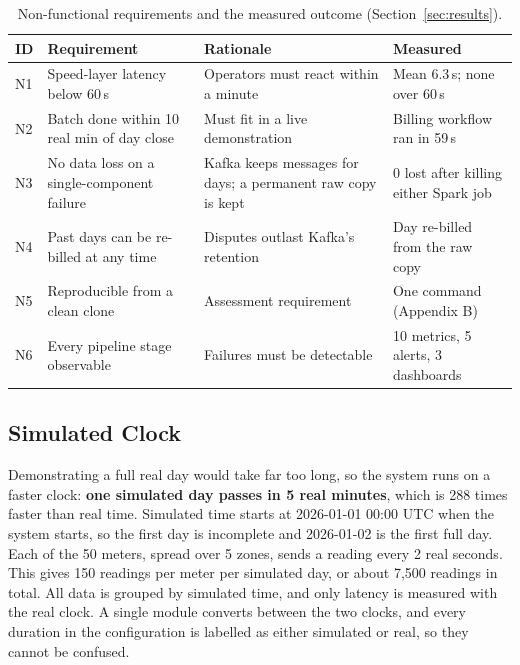 \documentclass[11pt,a4paper]{article}
\begin{document}
\begin{table}[!htbp]
\centering
\caption{Non-functional requirements and the measured outcome (Section~\ref{sec:results}).}
\label{tab:nfr}
\small
\begin{tabularx}{\textwidth}{L{0.6cm} L{4.6cm} L{3.8cm} X}
\toprule
\textbf{ID} & \textbf{Requirement} & \textbf{Rationale} & \textbf{Measured} \\
\midrule
N1 & Speed-layer latency below 60\,s & Operators must react within a minute & Mean 6.3\,s; none over 60\,s \\
N2 & Batch done within 10 real min of day close & Must fit in a live demonstration & Billing workflow ran in 59\,s \\
N3 & No data loss on a single-component failure & Kafka keeps messages for days; a permanent raw copy is kept & 0 lost after killing either Spark job \\
N4 & Past days can be re-billed at any time & Disputes outlast Kafka's retention & Day re-billed from the raw copy \\
N5 & Reproducible from a clean clone & Assessment requirement & One command (Appendix B) \\
N6 & Every pipeline stage observable & Failures must be detectable & 10 metrics, 5 alerts, 3 dashboards \\
\bottomrule
\end{tabularx}
\end{table}

\subsection{Simulated Clock}
\label{sec:simclock}

Demonstrating a full real day would take far too long, so the system runs on a faster clock:
\textbf{one simulated day passes in 5 real minutes}, which is 288 times faster than real
time. Simulated time starts at 2026-01-01 00:00 UTC when the system starts, so the first day
is incomplete and 2026-01-02 is the first full day. Each of the 50 meters, spread over 5
zones, sends a reading every 2 real seconds. This gives 150 readings per meter per simulated
day, or about 7{,}500 readings in total. All data is grouped by simulated time, and only
latency is measured with the real clock. A single module converts between the two clocks,
and every duration in the configuration is labelled as either simulated or real, so they
cannot be confused.


\end{document}
